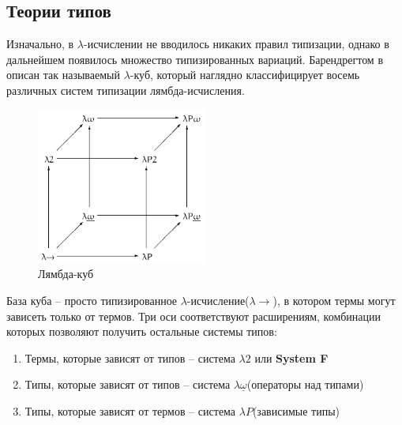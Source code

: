 \subsection{Теории типов}

Изначально, в $\lambda$-исчислении не вводилось никаких правил типизации, однако в дальнейшем появилось множество типизированных вариаций. Барендрегтом в~\cite{barendregt1993lambda} описан так называемый $\lambda$-куб, который наглядно классифицирует восемь различных систем типизации лямбда-исчисления.

\begin{figure}[H]
  \centering
  \includegraphics[width=0.5\textwidth]{img/Lambda_cube.png}
  \caption{Лямбда-куб\protect\footnotemark}
\end{figure}


База куба -- просто типизированное $\lambda$-исчисление($\lambda{\to}$), в котором термы могут зависеть только от термов. Три оси соответствуют расширениям, комбинации которых позволяют получить остальные системы типов:

\begin{enumerate}
  \item Термы, которые зависят от типов -- система $\lambda2$ или \textbf{System F}
  \item Типы, которые зависят от типов -- система $\lambda \underline{\omega}$(операторы над типами)
  \item Типы, которые зависят от термов -- система $\lambda P$(зависимые типы)
\end{enumerate}
